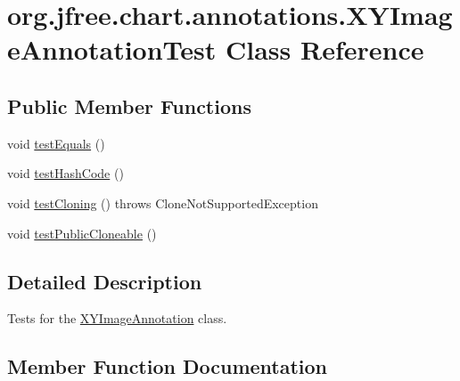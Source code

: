 \hypertarget{classorg_1_1jfree_1_1chart_1_1annotations_1_1_x_y_image_annotation_test}{}\section{org.\+jfree.\+chart.\+annotations.\+X\+Y\+Image\+Annotation\+Test Class Reference}
\label{classorg_1_1jfree_1_1chart_1_1annotations_1_1_x_y_image_annotation_test}
\subsection*{Public Member Functions}
\begin{DoxyCompactItemize}
\item 
void \mbox{\hyperlink{classorg_1_1jfree_1_1chart_1_1annotations_1_1_x_y_image_annotation_test_af85921cbab9e283e0e857b6b30670dfe}{test\+Equals}} ()
\item 
void \mbox{\hyperlink{classorg_1_1jfree_1_1chart_1_1annotations_1_1_x_y_image_annotation_test_ab50c9aaebf042746bcd7b0c4454c6e65}{test\+Hash\+Code}} ()
\item 
void \mbox{\hyperlink{classorg_1_1jfree_1_1chart_1_1annotations_1_1_x_y_image_annotation_test_ac65da3fb8e4e2a3b88edaf6249bdd33c}{test\+Cloning}} ()  throws Clone\+Not\+Supported\+Exception 
\item 
void \mbox{\hyperlink{classorg_1_1jfree_1_1chart_1_1annotations_1_1_x_y_image_annotation_test_a633151bc7f2696032c8cbf7fd2809a95}{test\+Public\+Cloneable}} ()
\end{DoxyCompactItemize}


\subsection{Detailed Description}
Tests for the \mbox{\hyperlink{classorg_1_1jfree_1_1chart_1_1annotations_1_1_x_y_image_annotation}{X\+Y\+Image\+Annotation}} class. 

\subsection{Member Function Documentation}
\mbox{\label{classorg_1_1jfree_1_1chart_1_1annotations_1_1_x_y_image_annotation_test_ac65da3fb8e4e2a3b88edaf6249bdd33c}} 
